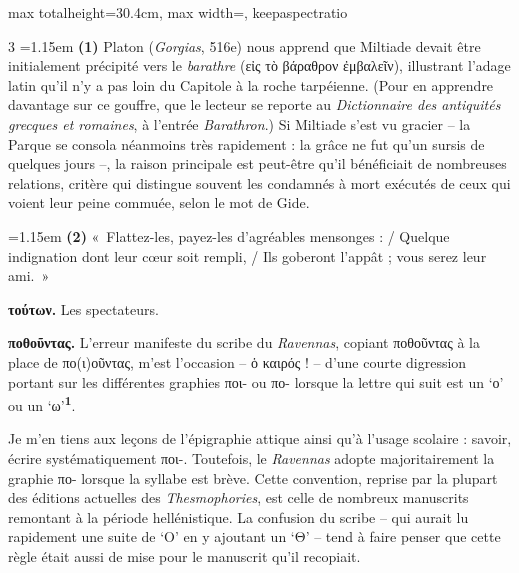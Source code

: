 \documentclass[11pt,twoside]{book}
\newcommand{\italique}[1]{\textit{#1}}
\newcommand{\latin}[1]{\textit{#1}}
\newcommand{\marqueur}[1]{\textsuperscript{\color{rubricRed}\textbf{#1}}}
\begin{document}
\begin{adjustbox}{max totalheight=30.4cm, max width=\textwidth, keepaspectratio}
\begin{minipage}{\textwidth}
{\begin{multicols}{3}
\noindent\hangindent=1.15em {\color{sepiaNote}\textbf{(1)}} Platon (\italique{Gorgias}, 516e) nous apprend que Miltiade devait être initialement précipité vers le \italique{barathre} (εἰς τὸ βάραθρον ἐμβαλεῖν), illustrant l'adage latin qu'il n'y a pas loin du Capitole à la roche tarpéienne. (Pour en apprendre davantage sur ce gouffre, que le lecteur se reporte au \italique{Dictionnaire des antiquités grecques et romaines}, à l'entrée \latin{Barathron}.) Si Miltiade s'est vu gracier -- la Parque se consola néanmoins très rapidement : la grâce ne fut qu'un sursis de quelques jours --, la raison principale est peut-être qu'il bénéficiait de nombreuses relations, critère qui distingue souvent les condamnés à mort exécutés de ceux qui voient leur peine commuée, selon le mot de Gide.
\par\vspace{1.5pt}
\noindent\hangindent=1.15em {\color{sepiaNote}\textbf{(2)}} «~Flattez-les, payez-les d'agréables mensonges : /	Quelque indignation dont leur cœur soit rempli, / Ils goberont l'appât ; vous serez leur ami.~»
\par\vspace{1.5pt}
 \textbf{τούτων.} Les spectateurs.
\par\vspace{1.5pt}
 \textbf{ποθοῦντας.} L'erreur manifeste du scribe du \italique{Ravennas}, copiant ποθοῦντας à la place de πο(ι)οῦντας, m'est l'occasion -- ὁ καιρός ! -- d'une courte digression portant sur les différentes graphies ποι- ou πο- lorsque la lettre qui suit est un `ο' ou un `ω'\marqueur{1}.
\par\vspace{1.5pt}
\noindent Je m'en tiens aux leçons de l'épigraphie attique ainsi qu'à l'usage scolaire : savoir, écrire systématiquement ποι-. Toutefois, le \italique{Ravennas} adopte majoritairement la graphie πο- lorsque la syllabe est brève. Cette convention, reprise par la plupart des éditions actuelles des \italique{Thesmophories}, est celle de nombreux manuscrits remontant à la période hellénistique. La confusion du scribe -- qui aurait lu rapidement une suite de `Ο' en y ajoutant un `Θ' -- tend à faire penser que cette règle était aussi de mise pour le manuscrit qu'il recopiait.
\par\end{multicols}}
\end{minipage}\end{adjustbox}
\end{document}
